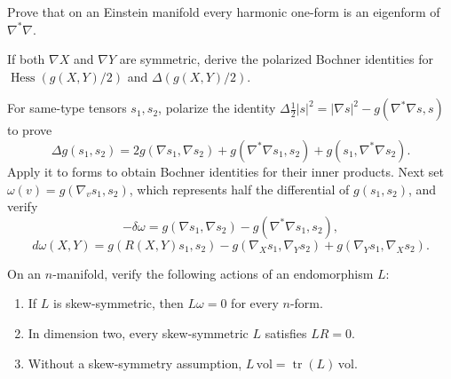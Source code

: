 \begin{remark}
  \label{rem:pet-ch9-exercise-9-6-7}

  Prove that on an Einstein manifold every harmonic one-form is an eigenform
  of $\nabla^*\nabla$.
\end{remark}

\begin{remark}
  \label{rem:pet-ch9-exercise-9-6-8}

  If both $\nabla X$ and $\nabla Y$ are symmetric, derive the polarized
  Bochner identities for
  $\operatorname{Hess}(g(X,Y)/2)$ and $\Delta(g(X,Y)/2)$.
\end{remark}

\begin{remark}
  \label{rem:pet-ch9-exercise-9-6-9}

  For same-type tensors $s_1,s_2$, polarize the identity
  $\Delta\tfrac12|s|^2=|\nabla s|^2-g(\nabla^*\nabla s,s)$ to prove
  \[
    \Delta g(s_1,s_2)=2g(\nabla s_1,\nabla s_2)+g(\nabla^*\nabla s_1,s_2)
    +g(s_1,\nabla^*\nabla s_2).
  \]
  Apply it to forms to obtain Bochner identities for their inner products.
  Next set $\omega(v)=g(\nabla_vs_1,s_2)$, which represents half the
  differential of $g(s_1,s_2)$, and verify
  \[
    -\delta\omega=g(\nabla s_1,\nabla s_2)-g(\nabla^*\nabla s_1,s_2),
  \]
  \[
    d\omega(X,Y)=g(R(X,Y)s_1,s_2)-g(\nabla_Xs_1,\nabla_Ys_2)+g(\nabla_Ys_1,\nabla_Xs_2).
  \]
\end{remark}

\begin{remark}
  \label{rem:pet-ch9-exercise-9-6-10}

  On an $n$-manifold, verify the following actions of an endomorphism $L$:
  \begin{enumerate}
    \item[(1)] If $L$ is skew-symmetric, then $L\omega=0$ for every $n$-form.
    \item[(2)] In dimension two, every skew-symmetric $L$ satisfies $LR=0$.
    \item[(3)] Without a skew-symmetry assumption,
      $L\,\mathrm{vol}=\operatorname{tr}(L)\,\mathrm{vol}$.
  \end{enumerate}
\end{remark}

